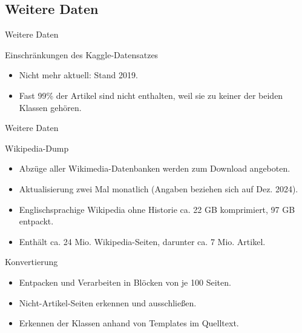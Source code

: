 \documentclass[aspectratio=169]{beamer} %
\begin{document}
\subsection{Weitere Daten}

\begin{frame}{Weitere Daten}
    \begin{block}{Einschränkungen des Kaggle-Datensatzes}
        \begin{itemize}
            \item Nicht mehr aktuell: Stand 2019.
            \item Fast 99\% der Artikel sind nicht enthalten, weil sie zu keiner der beiden Klassen gehören.
        \end{itemize}
    \end{block}
\end{frame}

\begin{frame}{Weitere Daten}
    \begin{block}{Wikipedia-Dump}
        \begin{itemize}
            \item Abzüge aller Wikimedia-Datenbanken werden zum Download angeboten.
            \item Aktualisierung zwei Mal monatlich (Angaben beziehen sich auf Dez. 2024).
            \item Englischsprachige Wikipedia ohne Historie ca. 22 GB komprimiert, 97 GB entpackt.
            \item Enthält ca. 24 Mio. Wikipedia-Seiten, darunter ca. 7 Mio. Artikel.
        \end{itemize}
    \end{block}
    \begin{block}{Konvertierung}
        \begin{itemize}
            \item Entpacken und Verarbeiten in Blöcken von je 100 Seiten.
            \item Nicht-Artikel-Seiten erkennen und ausschließen.
            \item Erkennen der Klassen anhand von Templates im Quelltext.
        \end{itemize}
    \end{block}
\end{frame}
\end{document}
